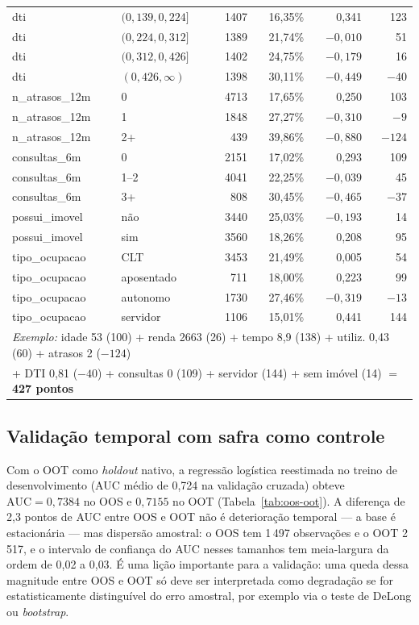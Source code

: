 \documentclass[11pt,a4paper]{article}
\newcommand{\auc}{\mathrm{AUC}}
\begin{document}
\begin{table}[H]
\begin{tabular}{llrrrr}
dti & $(0{,}139, 0{,}224]$ & 1407 & 16,35\% & 0,341 & 123 \\
dti & $(0{,}224, 0{,}312]$ & 1389 & 21,74\% & $-0{,}010$ & 51 \\
dti & $(0{,}312, 0{,}426]$ & 1402 & 24,75\% & $-0{,}179$ & 16 \\
dti & $(0{,}426, \infty)$ & 1398 & 30,11\% & $-0{,}449$ & $-40$ \\
\addlinespace
n\_atrasos\_12m & 0 & 4713 & 17,65\% & 0,250 & 103 \\
n\_atrasos\_12m & 1 & 1848 & 27,27\% & $-0{,}310$ & $-9$ \\
n\_atrasos\_12m & 2+ & 439 & 39,86\% & $-0{,}880$ & $-124$ \\
\addlinespace
consultas\_6m & 0 & 2151 & 17,02\% & 0,293 & 109 \\
consultas\_6m & 1--2 & 4041 & 22,25\% & $-0{,}039$ & 45 \\
consultas\_6m & 3+ & 808 & 30,45\% & $-0{,}465$ & $-37$ \\
\addlinespace
possui\_imovel & não & 3440 & 25,03\% & $-0{,}193$ & 14 \\
possui\_imovel & sim & 3560 & 18,26\% & 0,208 & 95 \\
\addlinespace
tipo\_ocupacao & CLT & 3453 & 21,49\% & 0,005 & 54 \\
tipo\_ocupacao & aposentado & 711 & 18,00\% & 0,223 & 99 \\
tipo\_ocupacao & autonomo & 1730 & 27,46\% & $-0{,}319$ & $-13$ \\
tipo\_ocupacao & servidor & 1106 & 15,01\% & 0,441 & 144 \\
\midrule
\multicolumn{6}{l}{\emph{Exemplo:} idade 53 (100) + renda 2663 (26) + tempo 8,9 (138) + utiliz. 0,43 (60) + atrasos 2 ($-124$)}\\
\multicolumn{6}{l}{\phantom{\emph{Exemplo:}} + DTI 0,81 ($-40$) + consultas 0 (109) + servidor (144) + sem imóvel (14) $=$ \textbf{427 pontos}}\\
\bottomrule
\end{tabular}
\end{table}

\subsection{Validação temporal com safra como controle}
\label{sec:res-safra}

Com o OOT como \emph{holdout} nativo, a regressão logística reestimada no treino de desenvolvimento (AUC médio de 0{,}724 na validação cruzada) obteve $\auc=0{,}7384$ no OOS e $0{,}7155$ no OOT (Tabela~\ref{tab:oos-oot}). A diferença de 2{,}3 pontos de AUC entre OOS e OOT não é deterioração temporal --- a base é estacionária --- mas dispersão amostral: o OOS tem 1\,497 observações e o OOT 2\,517, e o intervalo de confiança do AUC nesses tamanhos tem meia-largura da ordem de 0{,}02 a 0{,}03. É uma lição importante para a validação: uma queda dessa magnitude entre OOS e OOT só deve ser interpretada como degradação se for estatisticamente distinguível do erro amostral, por exemplo via o teste de DeLong ou \emph{bootstrap}.
\end{document}
